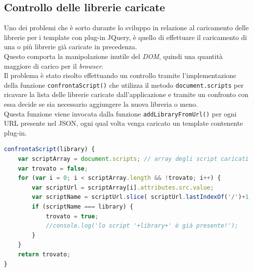 \subsection{Controllo delle librerie caricate}
Uno dei problemi che è sorto durante lo sviluppo in relazione al caricamento delle librerie per i template con plug-in JQuery, è quello di effettuare il caricamento di una o più librerie già caricate in precedenza.\\
Questo comporta la manipolazione inutile del \textit{DOM}, quindi una quantità maggiore di carico per il \textit{browser}.\\
Il problema è stato risolto effettuando un controllo tramite l'implementazione della funzione \texttt{confrontaScript()} che utilizza il metodo \texttt{document.scripts} per ricavare la lista delle librerie caricate dall'applicazione e tramite un confronto con essa decide se sia necessario aggiungere la nuova libreria o meno.\\
Questa funzione viene invocata dalla funzione \texttt{addLibraryFromUrl()} per ogni URL presente nel JSON, ogni qual volta venga caricato un template contenente plug-in.
\begin{lstlisting}[language= JavaScript, caption= Funzione che gestisce il caricamento di una libreria.]
confrontaScript(library) {
	var scriptArray = document.scripts; // array degli script caricati
	var trovato = false;
	for (var i = 0; i < scriptArray.length && !trovato; i++) {
		var scriptUrl = scriptArray[i].attributes.src.value;
		var scriptName = scriptUrl.slice( scriptUrl.lastIndexOf('/')+1, scriptUrl.length);
		if (scriptName === library) {
			trovato = true;
			//console.log('lo script '+library+' è già presente!');
		}
	}
	return trovato;
}

\end{lstlisting}

